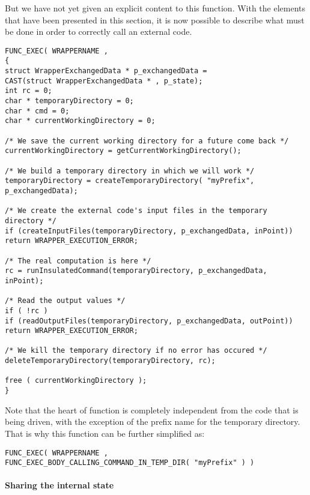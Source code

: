 But we have not yet given an explicit content to this function. With the elements that have been presented in this section, it is now possible to describe what must be done in order to correctly call an external code.

\lstset{language=C++, basicstyle=\normalsize}
\begin{lstlisting}[frame=TBRL]
FUNC_EXEC( WRAPPERNAME ,
{
struct WrapperExchangedData * p_exchangedData =
CAST(struct WrapperExchangedData * , p_state);
int rc = 0;
char * temporaryDirectory = 0;
char * cmd = 0;
char * currentWorkingDirectory = 0;

/* We save the current working directory for a future come back */
currentWorkingDirectory = getCurrentWorkingDirectory();

/* We build a temporary directory in which we will work */
temporaryDirectory = createTemporaryDirectory( "myPrefix", p_exchangedData);

/* We create the external code's input files in the temporary directory */
if (createInputFiles(temporaryDirectory, p_exchangedData, inPoint))
return WRAPPER_EXECUTION_ERROR;

/* The real computation is here */
rc = runInsulatedCommand(temporaryDirectory, p_exchangedData, inPoint);

/* Read the output values */
if ( !rc )
if (readOutputFiles(temporaryDirectory, p_exchangedData, outPoint))
return WRAPPER_EXECUTION_ERROR;

/* We kill the temporary directory if no error has occured */
deleteTemporaryDirectory(temporaryDirectory, rc);

free ( currentWorkingDirectory );
}
\end{lstlisting}

Note that the heart of function is completely independent from the code that is being driven, with the exception of the prefix name for the temporary directory. That is why this function can be further simplified as:

\lstset{language=C++, basicstyle=\normalsize}
\begin{lstlisting}[frame=TBRL]
FUNC_EXEC( WRAPPERNAME ,
FUNC_EXEC_BODY_CALLING_COMMAND_IN_TEMP_DIR( "myPrefix" ) )
\end{lstlisting}

\paragraph{Sharing the internal state}

